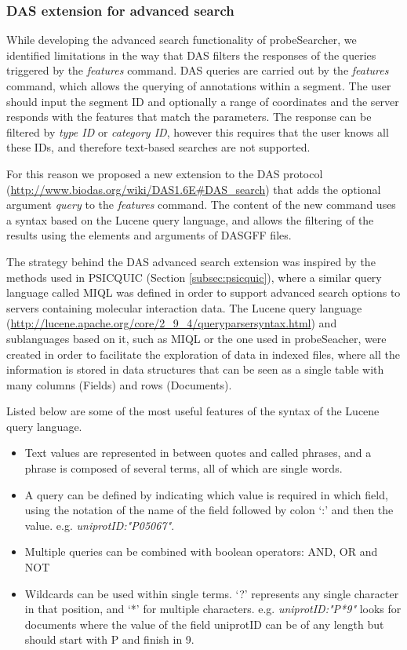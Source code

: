 \subsubsection{DAS extension for advanced search}
While developing the advanced search functionality of probeSearcher, we identified limitations in the way that DAS filters the responses of the queries triggered by the \emph{features} command. DAS queries are carried out by the \emph{features} command, which allows the querying  of annotations within  a segment. The user should input the segment ID  and optionally a range of coordinates and the server responds with the features that match the parameters. The response can be filtered by \emph{type ID} or \emph{category ID}, however this requires that the user knows all these IDs, and therefore text-based searches are not supported.

For this reason we proposed a new extension to the DAS protocol (\url{http://www.biodas.org/wiki/DAS1.6E#DAS\_search}) that adds the optional argument \emph{query} to the \emph{features} command. The content of the new command uses a syntax based on the Lucene query language, and allows the filtering of the results using the elements and arguments of DASGFF files.

The strategy behind the DAS advanced search extension was inspired by the methods used in PSICQUIC (Section \ref{subsec:psicquic}), where a similar query language called MIQL was defined in order to support advanced search options to servers containing molecular interaction data. The Lucene query language (\url{http://lucene.apache.org/core/2_9_4/queryparsersyntax.html}) and sublanguages based on it, such as MIQL or the one used in probeSeacher, were created in order to facilitate the exploration of data in indexed files, where all the information is stored in data structures that can be seen as a single table with many columns (Fields) and rows (Documents). 

Listed below are some of the most useful features of the syntax of the Lucene query language. 
\begin{itemize}
\setlength\itemsep{-0.3em}
 \item Text values are represented in between quotes and called phrases, and a phrase is composed of several terms, all of which are single words.
 \item A query can be defined by indicating which value is required in which field, using the notation of the name of the field followed by colon `:' and then the value. e.g. \emph{uniprotID:"P05067"}.
 \item Multiple queries can be combined with boolean operators: AND, OR and NOT
 \item Wildcards can be used within single terms. `?' represents any single character in that position, and `*' for multiple characters. e.g. \emph{uniprotID:"P*9"} looks for documents where the value of the field uniprotID can be of any length but should start with P and finish in 9.
\end{itemize}

